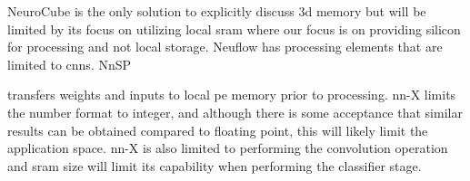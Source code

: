 {{{\iffalse
The current state-of-the-art does not:
\begin{outline}
  \1 currently propose streaming data directly from \ac{3ddram} through the processing functions to avoid the use of large local memory
  \1 propose data structures to support continuous streaming from \ac{dram}
  \1 propose a 3D-stack supporting more than one processing layer
\end{outline}
\fi

\iffalse
\begin{figure}
\centering
\begin{subfigure}{.45\textwidth}
  \centering
  \texttt{[image: kim2016neurocube\_fig4]}
  \captionsetup{justification=centering, skip=6pt}
  \caption{NeuroCube}
  \label{fig:NeuroCubeDie}
\end{subfigure}%
\begin{subfigure}{.45\textwidth}
  \centering
  \texttt{[image: chen2014diannao\_fig15]}
  \captionsetup{justification=centering, skip=10pt}
  \caption{Diannao (SB and NBx are \ac{sram})}
  \label{fig:DiannaoDie}
\end{subfigure}
\captionsetup{justification=centering, skip=3pt}
\caption{Example state-of-the-art die}
\label{fig:Example state-of-the-art die}
\end{figure}
\fi


\iffalse

NeuroCube\cite{kim2016neurocube} is the only solution to explicitly discuss \ac{3d} memory but will be limited by its focus on utilizing local \ac{sram} where our focus is on
providing silicon for processing and not local storage.
Neuflow\cite{farabet2011neuflow} has processing elements that are limited to \acp{cnn}.
NnSP{\cite{esmaeilzadeh2005nnsp} transfers weights and inputs to local \ac{pe} memory prior to processing.
nn-X\cite{gokhale2014240} limits the number format to integer, and although there is some acceptance that similar
results can be obtained compared to floating point, this will likely limit the application space. 
nn-X is also limited to performing the convolution operation and \ac{sram} size will limit its capability when performing the classifier stage.

}}}}
